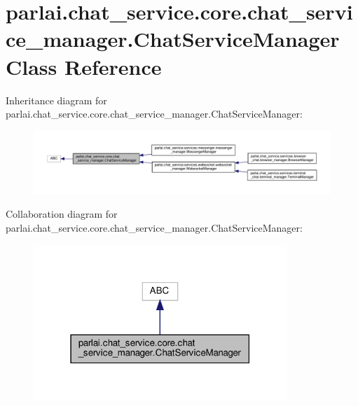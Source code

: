 \hypertarget{classparlai_1_1chat__service_1_1core_1_1chat__service__manager_1_1ChatServiceManager}{}\section{parlai.\+chat\+\_\+service.\+core.\+chat\+\_\+service\+\_\+manager.\+Chat\+Service\+Manager Class Reference}
\label{classparlai_1_1chat__service_1_1core_1_1chat__service__manager_1_1ChatServiceManager}


Inheritance diagram for parlai.\+chat\+\_\+service.\+core.\+chat\+\_\+service\+\_\+manager.\+Chat\+Service\+Manager\+:
\nopagebreak
\begin{figure}[H]
\begin{center}
\leavevmode
\includegraphics[width=350pt]{d6/d02/classparlai_1_1chat__service_1_1core_1_1chat__service__manager_1_1ChatServiceManager__inherit__graph}
\end{center}
\end{figure}


Collaboration diagram for parlai.\+chat\+\_\+service.\+core.\+chat\+\_\+service\+\_\+manager.\+Chat\+Service\+Manager\+:
\nopagebreak
\begin{figure}[H]
\begin{center}
\leavevmode
\includegraphics[width=271pt]{d4/d29/classparlai_1_1chat__service_1_1core_1_1chat__service__manager_1_1ChatServiceManager__coll__graph}
\end{center}
\end{figure}
